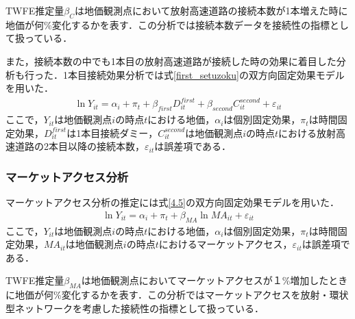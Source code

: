 TWFE推定量$\beta_{C}$は地価観測点において放射高速道路の接続本数が1本増えた時に地価が何\%変化するかを表す．この分析では接続本数データを接続性の指標として扱っている．

また，接続本数の中でも1本目の放射高速道路が接続した時の効果に着目した分析も行った．1本目接続効果分析では式\ref{first_setuzoku}の双方向固定効果モデルを用いた．
\begin{eqnarray}
  \ln{Y_{it}}= \alpha_{i} + \pi_{t} + \beta_{first}D^{first}_{it} + \beta_{second}C^{second}_{it} + \varepsilon_{it}
\label{first_setuzoku}
\end{eqnarray}
ここで，$Y_{it}$は地価観測点$i$の時点$t$における地価，$\alpha_{i}$は個別固定効果，$\pi_{t}$は時間固定効果，$D^{first}_{it}$は1本目接続ダミー，$C^{second}_{it}$は地価観測点$i$の時点$t$における放射高速道路の2本目以降の接続本数，$\varepsilon_{it}$は誤差項である．

\subsubsection{マーケットアクセス分析}
マーケットアクセス分析の推定には式\ref{4.5}の双方向固定効果モデルを用いた．
\begin{eqnarray}
  \ln{Y_{it}}= \alpha_{i} + \pi_{t} + \beta_{MA}\ln{{MA}_{it}}+ \varepsilon_{it}
    \label{4.5}
\end{eqnarray}  
ここで，$Y_{it}$は地価観測点$i$の時点$t$における地価，$\alpha_{i}$は個別固定効果，$\pi_{t}$は時間固定効果，$MA_{it}$は地価観測点$i$の時点$t$におけるマーケットアクセス，$\varepsilon_{it}$は誤差項である．

TWFE推定量$\beta_{MA}$は地価観測点においてマーケットアクセスが１\%増加したときに地価が何\%変化するかを表す．この分析ではマーケットアクセスを放射・環状型ネットワークを考慮した接続性の指標として扱っている．




